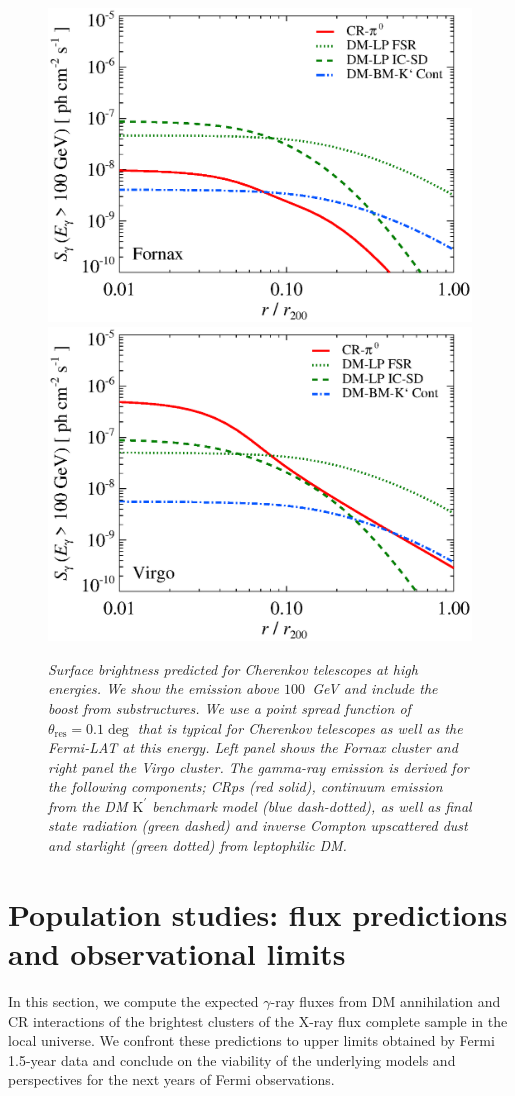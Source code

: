 \documentclass[10pt,aps,pra,reprint,amsmath,amsfonts,amssymb,showpacs,nofootinbib,floatfix]{revtex4-1}
\newcommand{\rmn}{\mathrm}
\newcommand{\psf}{\theta_\rmn{res}}
\newcommand{\Kp}{\rmn{K}^\prime}
\begin{document}
\begin{figure}
\begin{minipage}{2.0\columnwidth}
  \includegraphics[width=0.49\columnwidth]{figures/SB.Fornax.v11.SF300.SubMass.elmu.eps}
  \includegraphics[width=0.49\columnwidth]{figures/SB.Virgo.v11.SF300.SubMass.elmu.eps}
\caption{\it Surface brightness predicted for Cherenkov telescopes at
  high energies. We show the emission above $100$~GeV and include the
  boost from substructures. We use a point spread function of
  $\psf=0.1\deg$ that is typical for Cherenkov
  telescopes as well as the Fermi-LAT at this energy. Left panel shows
  the Fornax cluster and right panel the Virgo cluster. The gamma-ray
  emission is derived for the following components; CRps (red solid),
  continuum emission from the DM $\Kp$ benchmark model (blue
  dash-dotted), as well as final state radiation (green dashed) and
  inverse Compton upscattered dust and starlight (green dotted) from
  leptophilic DM.}
 \label{fig:SB_IACTs}
\end{minipage}
\end{figure}



\section{Population studies: flux predictions and observational limits}


In this section, we compute the expected $\gamma$-ray fluxes from DM
annihilation and CR interactions of the brightest clusters of the X-ray flux
complete sample in the local universe. We confront these predictions to upper
limits obtained by Fermi 1.5-year data and conclude on the viability of the
underlying models and perspectives for the next years of Fermi observations.
\end{document}

